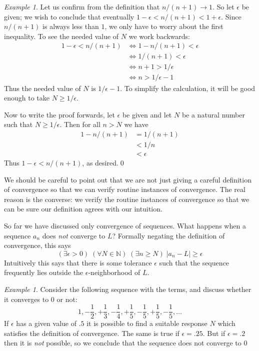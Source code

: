 \documentclass[11pt,oneside]{amsbook}
\newcommand{\N}{\mathbb N}
\theoremstyle{definition}
\theoremstyle{plain}
\theoremstyle{definition}
\theoremstyle{remark}
\newtheorem{example}[theorem]{Example}
\numberwithin{equation}{section}
\numberwithin{figure}{section}
\begin{document}
\begin{example}
  Let us confirm from the definition that $n/(n+1)\to1$. So let $\epsilon$ be given; we wish to conclude that eventually $1-\epsilon<n/(n+1)<1+\epsilon$. Since $n/(n+1)$ is always less than $1$, we only have to worry about the first inequality. To see the needed value of $N$ we work backwards:
  \begin{align*}
    1-\epsilon<n/(n+1)&\iff 1-n/(n+1)<\epsilon \\
                      &\iff 1/(n+1)<\epsilon \\
                      &\iff n+1>1/\epsilon \\
                      &\iff n>1/\epsilon-1
  \end{align*}
  Thus the needed value of $N$ is $1/\epsilon-1$. To simplify the calculation, it will be good enough to take $N\geq 1/\epsilon$.
  
  Now to write the proof forwards, let $\epsilon$ be given and let $N$ be a natural number such that $N\geq 1/\epsilon$. Then for all $n>N$ we have
  \begin{align*}
    1-n/(n+1) &= 1/(n+1)\\
              &< 1/n\\
              &<\epsilon
  \end{align*}
  Thus $1-\epsilon < n/(n+1)$, as desired.\qed
\end{example}

We should be careful to point out that we are not just giving a careful definition of convergence so that we can verify routine instances of convergence. The real reason is the converse: we verify the routine instances of convergence so that we can be sure our definition agrees with our intuition.


So far we have discussed only convergence of sequences. What happens when a sequence $a_n$ does \emph{not} converge to $L$? Formally negating the definition of convergence, this says
\[(\exists\epsilon>0)\;(\forall N\in\N)\;(\exists n\geq N)\;|a_n-L|\geq\epsilon
\]
Intuitively this says that there is some tolerance $\epsilon$ such that the sequence frequently lies outside the $\epsilon$-neighborhood of $L$.

\begin{example}
  Consider the following sequence with the terms, and discuss whether it converges to $0$ or not:
  \[1,-\frac12,+\frac13,-\frac14,+\frac15,-\frac15,+\frac15,-\frac15,\ldots
  \]
  If $\epsilon$ has a given value of $.5$ it is possible to find a suitable response $N$ which satisfies the definition of convergence. The same is true if $\epsilon=.25$. But if $\epsilon=.2$ then it is \emph{not} possible, so we conclude that the sequence does not converge to $0$
\end{example}
\end{document}

